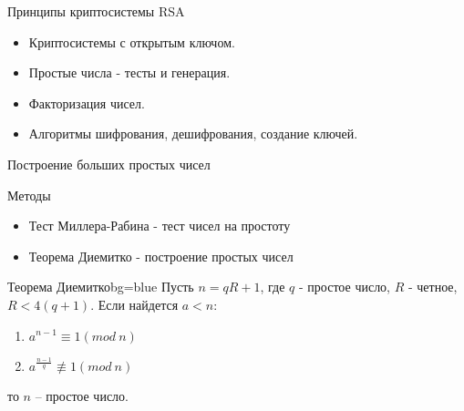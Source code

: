 
\begin{frame}{Принципы криптосистемы RSA}
	\begin{center}
		\begin{itemize}
			\item Криптосистемы с открытым ключом. \vspace{0.5cm}
	        \item Простые числа - тесты и генерация. \vspace{0.5cm}
	        \item Факторизация чисел. \vspace{0.5cm}
	        \item Алгоритмы шифрования, дешифрования, создание ключей.
    	\end{itemize}
	\end{center}
\end{frame}

\begin{frame}{Построение больших простых чисел}
	\begin{block}{Методы}
		\begin{itemize}
			\item Тест Миллера-Рабина - тест чисел на простоту 
			\item Теорема Диемитко - построение простых чисел        
		\end{itemize}	
	\end{block}

	\begin{importantblock}{Теорема Диемитко}{}{bg=blue}
		Пусть {$n = q R + 1$}, где {$q$} - простое число, {$R$} - четное, {$R < 4(q + 1)$}. Если найдется {$a < n$}:
      
			\begin{enumerate}
			 \item {$a^{n - 1} \equiv 1(mod \: n)$}
			 \item {$a^{\frac{n - 1}{q}} \not\equiv 1(mod \: n)$}
			\end{enumerate}
			
      то {$n$} – простое число.
	\end{importantblock}
\end{frame}

